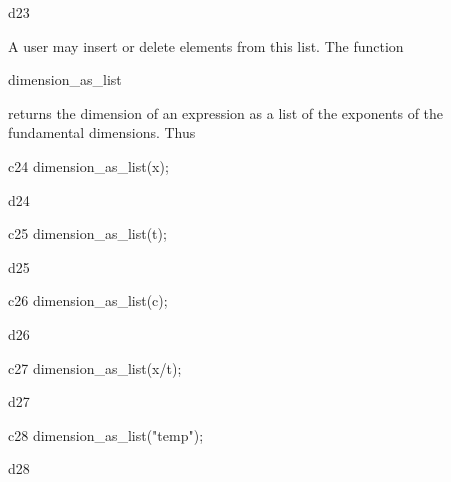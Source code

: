\documentclass[12pt]{article}
\begin{document}
\begin{mdline}{d23}
\end{mdline}


\noindent A user may insert or delete elements from this list.
The function \begin{verb} dimension_as_list \end{verb} returns the dimension
of an expression as a list of the exponents of the
fundamental dimensions. Thus

\vspace{0.1in}



\begin{mcline}{c24}
dimension_as_list(x);
\end{mcline}



\begin{mdline}{d24}
\left[ 0,1,0 \right] 
\end{mdline}

\begin{mcline}{c25}
dimension_as_list(t);
\end{mcline}



\begin{mdline}{d25}
\left[ 0,0,1 \right] 
\end{mdline}

\begin{mcline}{c26}
dimension_as_list(c);
\end{mcline}



\begin{mdline}{d26}
\left[ 0,1,-1 \right] 
\end{mdline}

\begin{mcline}{c27}
dimension_as_list(x/t);
\end{mcline}



\begin{mdline}{d27}
\left[ 0,1,-1 \right] 
\end{mdline}

\begin{mcline}{c28}
dimension_as_list("temp");
\end{mcline}



\begin{mdline}{d28}
 \left[ 0,0,0 \right] 
\end{mdline}
\end{document}
